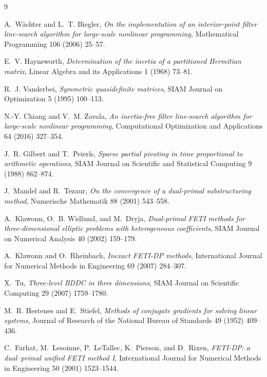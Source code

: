 \documentclass[11pt]{article}
\begin{document}
\begin{thebibliography}{9}

A.~W\"achter and L.~T. Biegler,
\emph{On the implementation of an interior-point filter line-search
algorithm for large-scale nonlinear programming},
Mathematical Programming 106 (2006) 25--57.

E.~V. Haynsworth,
\emph{Determination of the inertia of a partitioned Hermitian matrix},
Linear Algebra and its Applications 1 (1968) 73--81.

R.~J. Vanderbei,
\emph{Symmetric quasidefinite matrices},
SIAM Journal on Optimization 5 (1995) 100--113.

N.-Y. Chiang and V.~M. Zavala,
\emph{An inertia-free filter line-search algorithm for large-scale nonlinear
programming},
Computational Optimization and Applications 64 (2016) 327--354.

J.~R. Gilbert and T.~Peierls,
\emph{Sparse partial pivoting in time proportional to arithmetic
operations},
SIAM Journal on Scientific and Statistical Computing 9 (1988) 862--874.

J.~Mandel and R.~Tezaur,
\emph{On the convergence of a dual-primal substructuring method},
Numerische Mathematik 88 (2001) 543--558.

A.~Klawonn, O.~B. Widlund, and M.~Dryja,
\emph{Dual-primal FETI methods for three-dimensional elliptic problems with
heterogeneous coefficients},
SIAM Journal on Numerical Analysis 40 (2002) 159--179.

A.~Klawonn and O.~Rheinbach,
\emph{Inexact FETI-DP methods},
International Journal for Numerical Methods in Engineering 69 (2007)
284--307.

X.~Tu,
\emph{Three-level BDDC in three dimensions},
SIAM Journal on Scientific Computing 29 (2007) 1759--1780.

M.~R. Hestenes and E.~Stiefel,
\emph{Methods of conjugate gradients for solving linear systems},
Journal of Research of the National Bureau of Standards 49 (1952) 409--436.

C.~Farhat, M.~Lesoinne, P.~LeTallec, K.~Pierson, and D.~Rixen,
\emph{FETI-DP: a dual--primal unified FETI method I},
International Journal for Numerical Methods in Engineering 50 (2001)
1523--1544.


\end{thebibliography}
\end{document}
